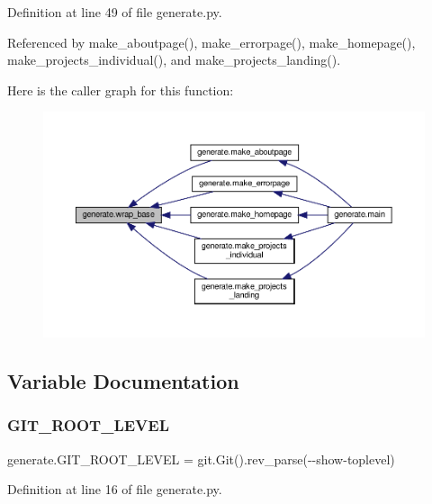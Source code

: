 Definition at line 49 of file generate.\+py.



Referenced by make\+\_\+aboutpage(), make\+\_\+errorpage(), make\+\_\+homepage(), make\+\_\+projects\+\_\+individual(), and make\+\_\+projects\+\_\+landing().

Here is the caller graph for this function\+:
\nopagebreak
\begin{figure}[H]
\begin{center}
\leavevmode
\includegraphics[width=350pt]{namespacegenerate_adb990cdb948e21150b35af85d236b6be_icgraph}
\end{center}
\end{figure}


\subsection{Variable Documentation}
\mbox{\label{namespacegenerate_afea39d363835652697e0616074816686}} 
\subsubsection{\texorpdfstring{G\+I\+T\+\_\+\+R\+O\+O\+T\+\_\+\+L\+E\+V\+EL}{GIT\_ROOT\_LEVEL}}
{\footnotesize\ttfamily generate.\+G\+I\+T\+\_\+\+R\+O\+O\+T\+\_\+\+L\+E\+V\+EL = git.\+Git().rev\+\_\+parse(\textquotesingle{}-\/-\/show-\/toplevel\textquotesingle{})}



Definition at line 16 of file generate.\+py.

